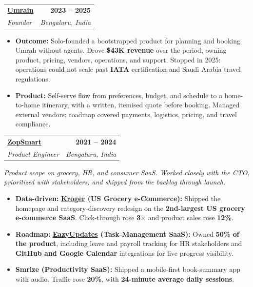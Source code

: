 \documentclass[letterpaper,10.5pt]{article}
\makeatletter
\newcommand{\entry}[4]{%
  \begin{tabularx}{\linewidth}{@{}X@{}r@{}}
    \textbf{#1} & \textbf{#4} \\
    \textit{#2} & \textit{#3} \\
  \end{tabularx}%
  \vspace{1pt}
}
\makeatother
\begin{document}
\entry{\href{https://umrain.in}{Umrain}}{Founder}{Bengaluru, India}{2023 -- 2025}
\begin{itemize}
  \item \textbf{Outcome:} Solo-founded a bootstrapped product for planning and booking Umrah without agents. Drove \textbf{\$43K revenue} over the period, owning product, pricing, vendors, operations, and support. Stopped in 2025: operations could not scale past \textbf{IATA} certification and Saudi Arabia travel regulations.
  \item \textbf{Product:} Self-serve flow from preferences, budget, and schedule to a home-to-home itinerary, with a written, itemised quote before booking. Managed external vendors; roadmap covered payments, logistics, pricing, and travel compliance.
\end{itemize}

\entry{\href{https://zopsmart.com}{ZopSmart}}{Product Engineer}{Bengaluru, India}{2021 -- 2024}
{\small\textit{Product scope on grocery, HR, and consumer SaaS. Worked closely with the CTO, prioritized with stakeholders, and shipped from the backlog through launch.}}
\begin{itemize}
  \item \textbf{Data-driven:} \textbf{\href{https://www.kroger.com}{Kroger} (US Grocery e-Commerce):} Shipped the homepage and category-discovery redesign on the \textbf{2nd-largest US grocery e-commerce SaaS}. Click-through rose \textbf{3$\times$} and product sales rose \textbf{12\%}.
  \item \textbf{Roadmap:} \textbf{\href{https://eazyupdates.com}{EazyUpdates} (Task-Management SaaS):} Owned \textbf{50\% of the product}, including leave and payroll tracking for HR stakeholders and \textbf{GitHub and Google Calendar} integrations for live progress visibility.
  \item \textbf{Smrize (Productivity SaaS):} Shipped a mobile-first book-summary app with audio. Traffic rose \textbf{20\%}, with \textbf{24-minute average daily sessions}.
\end{itemize}
\end{document}
